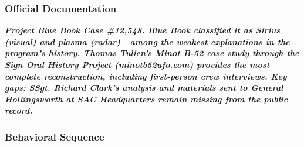 \documentclass[11pt,letterpaper]{article}
\begin{document}
\subsubsection{Official Documentation}

\textbf{\textit{Project Blue Book Case \#12,548. Blue Book classified it as Sirius (visual) and plasma (radar)---among the weakest explanations in the program's history. Thomas Tulien's Minot B-52 case study through the Sign Oral History Project (minotb52ufo.com) provides the most complete reconstruction, including first-person crew interviews. Key gaps: SSgt. Richard Clark's analysis and materials sent to General Hollingsworth at SAC Headquarters remain missing from the public record.}}


\subsubsection{Behavioral Sequence}
\end{document}
